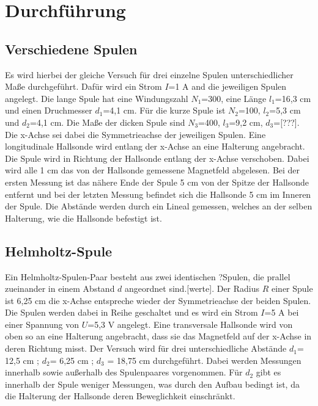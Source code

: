 \section{Durchführung}
\label{sec:Durchführung}

    \subsection{Verschiedene Spulen}

        Es wird hierbei der gleiche Versuch für drei einzelne Spulen 
        unterschiedlicher Maße durchgeführt. Dafür wird ein Strom $I$=1 \si{\ampere}
        and die jeweiligen Spulen angelegt. Die lange Spule hat eine 
        Windungszahl $N_1$=300, eine Länge $l_1$=16,3 \si{\centi\meter} und 
        einen Druchmesser $d_1$=4,1 \si{\centi\meter}. Für die kurze Spule ist 
        $N_2$=100, $l_2$=5,3 \si{\centi\meter} und $d_2$=4,1 \si{\centi\meter}.
        Die Maße der dicken Spule sind $N_3$=400, $l_3$=9,2 \si{\centi\meter},
        $d_3$=[???]. Die x-Achse sei dabei die Symmetrieachse 
        der jeweiligen Spulen. Eine longitudinale Hallsonde wird entlang der x-Achse
        an eine Halterung angebracht. Die Spule wird in Richtung der Hallsonde
        entlang der x-Achse verschoben. Dabei wird alle 1 \si{\centi\meter} das von 
        der Hallsonde gemessene Magnetfeld abgelesen. Bei der ersten Messung ist das nähere 
        Ende der Spule 5 \si{\centi\meter} von der Spitze der Hallsonde entfernt und bei 
        der letzten Messung befindet sich die Hallsonde 5 \si{\centi\meter} im Inneren
        der Spule. Die Abstände werden durch ein Lineal gemessen, welches an der selben
        Halterung, wie die Hallsonde befestigt ist.

    \subsection{Helmholtz-Spule}
        
        Ein Helmholtz-Spulen-Paar besteht aus zwei identischen ?Spulen, die prallel zueinander
        in einem Abstand $d$ angeordnet sind.[werte]. Der Radius $R$ einer Spule ist 6,25 \si{\centi\meter}
        die x-Achse entspreche wieder der Symmetrieachse der beiden Spulen. Die Spulen werden dabei in
        Reihe geschaltet und es wird ein Strom $I$=5 \si{\ampere} bei einer Spannung von $U$=5,3 \si{\volt}
        angelegt. Eine transversale Hallsonde wird von oben so an eine Halterung angebracht, 
        dass sie das Magnetfeld auf 
        der x-Achse in deren Richtung misst. Der Versuch wird für drei unterschiedliche 
        Abstände $d_1$= 12,5 \si{\centi\meter} ; $d_2$= 6,25 \si{\centi\meter} ; 
        $d_3$ = 18,75 \si{\centi\meter} durchgeführt. Dabei werden Messungen innerhalb sowie außerhalb 
        des Spulenpaares vorgenommen. Für $d_2$ gibt es innerhalb der Spule weniger Messungen, was
        durch den Aufbau bedingt ist, da die Halterung der Hallsonde deren Beweglichkeit einschränkt.


